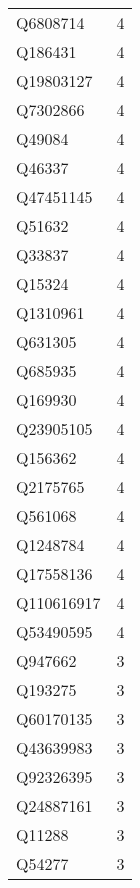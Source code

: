 \begin{tabular}{lr}
    Q6808714 &                             4 \\
     Q186431 &                             4 \\
   Q19803127 &                             4 \\
    Q7302866 &                             4 \\
      Q49084 &                             4 \\
      Q46337 &                             4 \\
   Q47451145 &                             4 \\
      Q51632 &                             4 \\
      Q33837 &                             4 \\
      Q15324 &                             4 \\
    Q1310961 &                             4 \\
     Q631305 &                             4 \\
     Q685935 &                             4 \\
     Q169930 &                             4 \\
   Q23905105 &                             4 \\
     Q156362 &                             4 \\
    Q2175765 &                             4 \\
     Q561068 &                             4 \\
    Q1248784 &                             4 \\
   Q17558136 &                             4 \\
  Q110616917 &                             4 \\
   Q53490595 &                             4 \\
     Q947662 &                             3 \\
     Q193275 &                             3 \\
   Q60170135 &                             3 \\
   Q43639983 &                             3 \\
   Q92326395 &                             3 \\
   Q24887161 &                             3 \\
      Q11288 &                             3 \\
      Q54277 &                             3 \\

\end{tabular}
